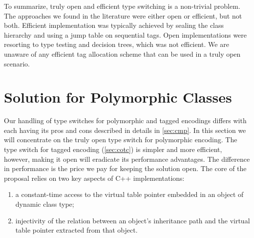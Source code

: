 To summarize, truly open and efficient type switching is a non-trivial problem. 
The approaches we found in the literature were either open or efficient, 
but not both. Efficient implementation was typically achieved by sealing the 
class hierarchy and using a jump table on sequential tags. Open implementations 
were resorting to type testing and decision trees, which was not efficient. 
We are unaware of any efficient tag allocation scheme that can be used in a 
truly open scenario.


%

%

\section{Solution for Polymorphic Classes}
\label{sec:copc}

Our handling of type switches for polymorphic and tagged encodings differs 
with each having its pros and cons described in details in \textsection\ref{sec:cmp}.
In this section we will concentrate on the truly open type switch for 
polymorphic encoding. The type switch for tagged encoding (\textsection\ref{sec:cotc}) 
is simpler and more efficient, however, making it open will eradicate its 
performance advantages. The difference in performance is the price we pay for 
keeping the solution open.  The core of the proposal relies on two key
aspects of C++ implementations:
\begin{enumerate}
\item a constant-time access to the virtual table pointer embedded in an object of
  dynamic class type;
\item injectivity of the relation between an object's inheritance path
  and the virtual table pointer extracted from that object.
\end{enumerate}

